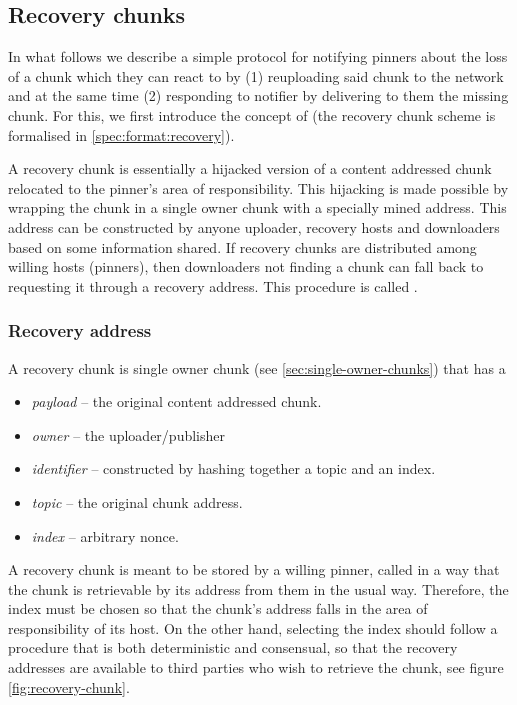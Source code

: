 
\subsection{Recovery chunks \statusyellow}\label{sec:recovery-chunks}


In what follows we describe a simple protocol for notifying pinners about the loss of a chunk which they can react to by (1) reuploading said chunk to the network and at the same time (2) responding to notifier by delivering to them the missing chunk. For this, we first introduce the concept of  (the recovery chunk scheme is formalised in \ref{spec:format:recovery}).

A recovery chunk is essentially a hijacked version of a content addressed chunk relocated to the pinner's area of responsibility. This hijacking is made possible by wrapping the chunk in a single owner chunk with a specially mined address. This address can be constructed by anyone uploader, recovery hosts and downloaders based on some information shared.
If recovery chunks are distributed among willing hosts (pinners), then downloaders not finding a chunk can  fall back to requesting it through a recovery address.
This procedure is called .

\subsubsection{Recovery address}
 
A recovery chunk is single owner chunk (see \ref{sec:single-owner-chunks}) that has a  

\begin{itemize}
\item \emph{payload} -- the original content addressed chunk.
\item \emph{owner} -- the uploader/publisher
\item \emph{identifier} -- constructed by hashing together a topic and an index.
\item \emph{topic} -- the original chunk address.
\item \emph{index} -- arbitrary nonce. \end{itemize}



A recovery chunk is meant to be stored by a willing pinner, called  in a way that the chunk is retrievable by its address from them in the usual way. Therefore, the index must be chosen so that the chunk's address falls in the area of responsibility of its host. 
On the other hand, selecting the index should follow a procedure that is both deterministic and consensual, so that the recovery addresses are available to third parties who wish to retrieve the chunk, see figure \ref{fig:recovery-chunk}.


